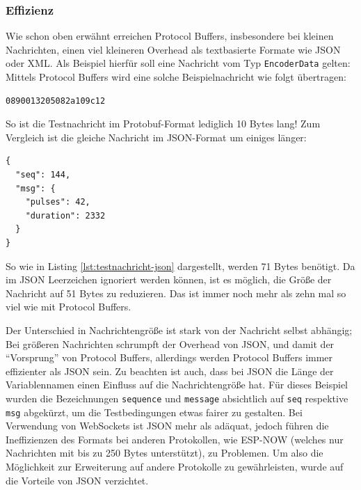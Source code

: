 \subsubsection{Effizienz}
Wie schon oben erwähnt erreichen Protocol Buffers,
insbesondere bei kleinen Nachrichten,
einen viel kleineren Overhead als textbasierte Formate wie JSON oder XML.
%
Als Beispiel hierfür soll eine Nachricht vom Typ \texttt{EncoderData} gelten:
%
Mittels Protocol Buffers wird eine solche Beispielnachricht wie folgt übertragen:
%
\begin{lstlisting}[label=lst:testnachricht-proto,caption=Testnachricht (Protobuf) in Hexadezimaldarstellung]
    0890013205082a109c12
\end{lstlisting}
So ist die Testnachricht im Protobuf-Format lediglich 10 Bytes lang!
%
Zum Vergleich ist die gleiche Nachricht im JSON-Format um einiges länger:
\begin{lstlisting}[label=lst:testnachricht-json,caption=Testnachricht (JSON) als formattierter String]
{
  "seq": 144,
  "msg": {
    "pulses": 42,
    "duration": 2332
  }
}
\end{lstlisting}
So wie in Listing \ref{lst:testnachricht-json} dargestellt,
werden 71 Bytes benötigt.
%
Da im JSON Leerzeichen ignoriert werden können,
ist es möglich, die Größe der Nachricht auf 51 Bytes zu reduzieren.
%
Das ist immer noch mehr als zehn mal so viel wie mit Protocol Buffers.

Der Unterschied in Nachrichtengröße ist stark von der Nachricht selbst abhängig;
Bei größeren Nachrichten schrumpft der Overhead von JSON,
und damit der ``Vorsprung'' von Protocol Buffers,
allerdings werden Protocol Buffers immer effizienter als JSON sein.
%
Zu beachten ist auch,
dass bei JSON die Länge der Variablennamen einen Einfluss auf die Nachrichtengröße hat.
%
Für dieses Beispiel wurden die Bezeichnungen \texttt{sequence} und \texttt{message} absichtlich auf
\texttt{seq} respektive \texttt{msg} abgekürzt,
um die Testbedingungen etwas fairer zu gestalten.
%
Bei Verwendung von WebSockets ist JSON mehr als adäquat,
jedoch führen die Ineffizienzen des Formats bei anderen Protokollen,
wie ESP-NOW \cite{esp-now} (welches nur Nachrichten mit bis zu 250 Bytes unterstützt),
zu Problemen.
%
Um also die Möglichkeit zur Erweiterung auf andere Protokolle zu gewährleisten,
wurde auf die Vorteile von JSON verzichtet.

